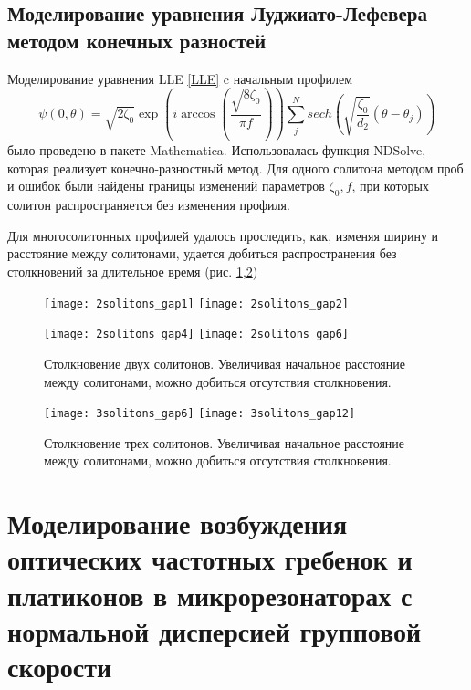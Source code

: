 \subsection{Моделирование уравнения Луджиато-Лефевера методом конечных разностей}

Моделирование уравнения LLE \eqref{LLE} c начальным профилем
\begin{equation} \label{initial_cond_soliton}
\psi(0,\theta)=\sqrt{2\zeta_0}\exp (i \arccos(\frac{\sqrt{8\zeta_0}}{\pi f}))\sum_j^N sech(\sqrt{\frac{\zeta_0}{d_2}}(\theta-\theta_j))
\end{equation}
было проведено в пакете Mathematica. Использовалась функция NDSolve, которая реализует конечно-разностный метод. Для одного солитона методом проб и ошибок были найдены границы изменений параметров $\zeta_0,f$, при которых солитон распространяется без изменения профиля.

Для многосолитонных профилей удалось проследить, как, изменяя ширину и расстояние между солитонами, удается добиться распространения без столкновений за длительное время (рис. \ref{2solitons},\ref{3solitons})
\begin{figure}
  \texttt{[image: 2solitons\_gap1]}
  \texttt{[image: 2solitons\_gap2]}
\end{figure}

\begin{figure}
  \texttt{[image: 2solitons\_gap4]}
  \texttt{[image: 2solitons\_gap6]}
  \caption{Столкновение двух солитонов. Увеличивая начальное расстояние между солитонами, можно добиться отсутствия столкновения.} \label{2solitons}
\end{figure}

\begin{figure}

  \texttt{[image: 3solitons\_gap6]}
  \texttt{[image: 3solitons\_gap12]}
  \caption{Столкновение трех солитонов. Увеличивая начальное расстояние между солитонами, можно добиться отсутствия столкновения.} \label{3solitons}
\end{figure}


\section{Моделирование возбуждения оптических частотных гребенок и платиконов в микрорезонаторах с нормальной дисперсией групповой скорости}

